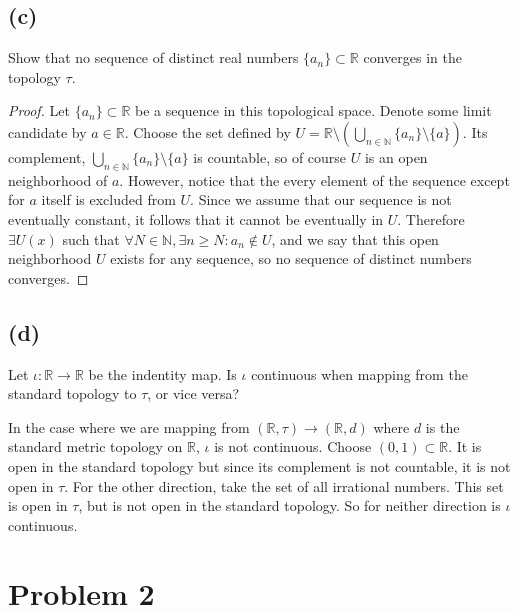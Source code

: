 \documentclass{article}
\theoremstyle{definition}
\begin{document}
\subsection*{(c)}
\begin{mdframed}
    Show that no sequence of distinct real numbers $\{a_n\} \subset \mathbb{R}$ converges in the topology $\tau$.
\end{mdframed}
\begin{proof}
    Let $\{a_n\}\subset\mathbb{R}$ be a sequence in this topological space. Denote some limit candidate by $a \in \mathbb{R}$.
    Choose the set defined by $U = \mathbb{R} \setminus \left(\bigcup_{n \in \mathbb{N}}\{a_n\} \setminus \{a\}\right)$. Its complement,
    $\bigcup_{n \in \mathbb{N}}\{a_n\} \setminus \{a\}$ is countable, so of course $U$ is an open neighborhood of $a$. 
    However, notice that the every element of the sequence except for $a$ itself is excluded from $U$.
    Since we assume that our sequence is not eventually constant, it follows that it cannot be eventually in $U$.
    Therefore $\exists U(x)$ such that $\forall N \in \mathbb{N}, \exists n \geqslant N : a_n \notin U$, and 
    we say that this open neighborhood $U$ exists for any sequence, so no sequence of distinct numbers converges.
\end{proof}
\subsection*{(d)}
\begin{mdframed}
    Let $\iota : \mathbb{R} \rightarrow \mathbb{R}$ be the indentity map. Is $\iota$ continuous when mapping from the standard topology 
    to $\tau$, or vice versa?
\end{mdframed}
In the case where we are mapping from $(\mathbb{R}, \tau) \rightarrow (\mathbb{R}, d)$ where $d$ is the standard metric topology on $\mathbb{R}$,
$\iota$ is not continuous. Choose $(0,1) \subset \mathbb{R}$. It is open in the standard topology but since its complement is not countable,
it is not open in $\tau$. For the other direction, take the set of all irrational numbers. This set is open in $\tau$, but is not open in 
the standard topology. So for neither direction is $\iota$ continuous.
\section*{Problem 2}
\end{document}
